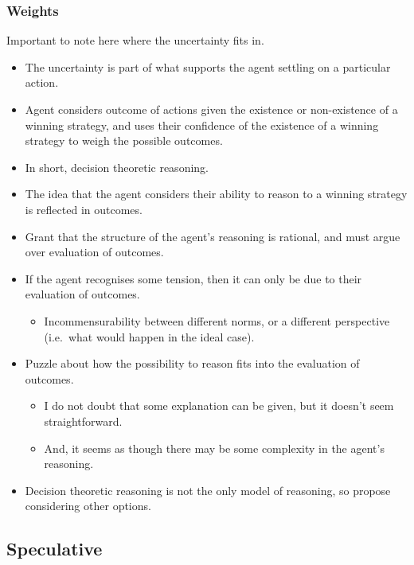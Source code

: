 \documentclass[10pt]{article}
\newcommand{\hozlinedash}[0]{%
  \noindent\hdashrule[0.5ex][c]{\textwidth}{.1pt}{2.5pt}
}
\begin{document}
\subsubsection{Weights}
\label{sec:weights}

\begin{note}
  Important to note here where the uncertainty fits in.
  \begin{itemize}
  \item The uncertainty is part of what supports the agent settling on a particular action.
  \end{itemize}
\end{note}

\begin{itemize}
\item Agent considers outcome of actions given the existence or non-existence of a winning strategy, and uses their confidence of the existence of a winning strategy to weigh the possible outcomes.
\item In short, decision theoretic reasoning.
\item The idea that the agent considers their ability to reason to a winning strategy is reflected in outcomes.
\item Grant that the structure of the agent's reasoning is rational, and must argue over evaluation of outcomes.
\item If the agent recognises some tension, then it can only be due to their evaluation of outcomes.
  \begin{itemize}
  \item Incommensurability between different norms, or a different perspective (i.e.\ what would happen in the ideal case).
  \end{itemize}
\item Puzzle about how the possibility to reason fits into the evaluation of outcomes.
  \begin{itemize}
  \item I do not doubt that some explanation can be given, but it doesn't seem straightforward.
  \item And, it seems as though there may be some complexity in the agent's reasoning.
  \end{itemize}
\item Decision theoretic reasoning is not the only model of reasoning, so propose considering other options.
\end{itemize}

\hozlinedash

\subsection{Speculative}
\label{sec:speculative}
\end{document}
